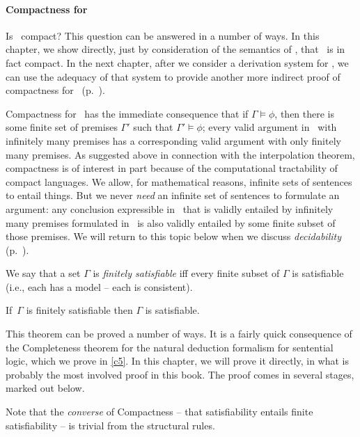 \paragraph{Compactness for \lone} Is \lone\ compact? This question can be answered in a number of ways. In this chapter, we show directly, just by consideration of the semantics of \lone, that \lone\ is in fact compact. In the next chapter, after we consider a derivation system for \lone, we can use the adequacy of that system to provide another more indirect proof of compactness for \lone\ (p.\ \pageref{compagain}).

Compactness for \lone\ has the immediate consequence that if $\Gamma\vDash\phi$, then there is some finite set of premises $\Gamma'$ such that $\Gamma'\vDash\phi$; every valid argument in \lone\ with infinitely many premises has a corresponding valid argument with only finitely many premises. As suggested above in connection with the interpolation theorem, compactness is of interest in part because of the computational tractability of compact languages. We allow, for mathematical reasons, infinite sets of sentences to entail things. But we never \emph{need} an infinite set of sentences to formulate an argument: any conclusion expressible in \lone\ that is validly entailed by infinitely many premises formulated in \lone\ is also validly entailed by some finite subset of those premises. We will return to this topic below when we discuss \emph{decidability} (p.\ \pageref{decide}).

\begin{definition}
	We say that a set $\Gamma$ is \emph{finitely satisfiable} iff every finite subset of $\Gamma$ is satisfiable (i.e., each has a model – each is consistent).
\end{definition}
\begin{theorem}[Compactness]\label{compact}
If\, $\Gamma$ is finitely satisfiable then $\Gamma$ is satisfiable. 
\end{theorem}

This theorem can be proved a number of ways. It is a fairly quick consequence of the Completeness theorem for the natural deduction formalism for sentential logic, which we prove in \autoref{c5}. In this chapter, we will prove it directly, in what is probably the most involved proof in this book. The proof comes in several stages, marked out below.

Note that the \emph{converse} of Compactness – that satisfiability entails finite satisfiability – is trivial from the structural rules.

